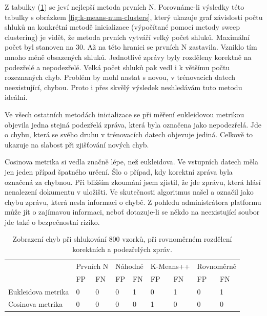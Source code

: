 \documentclass[thesis=M,czech]{FITthesis}[2012/10/20]
\begin{document}
		Z tabulky (\ref{tab:clustering_errors}) se jeví nejlepší metoda prvních N. Porovnáme-li výsledky této tabulky s obrázkem \ref{fig:k-means-num-clusters}, který ukazuje graf závislosti počtu shluků na konkrétní metodě inicializace (výpočítané pomocí metody sweep clustering) je vidět, že metoda prvních vytváří velký počet shluků. Maximální počet byl stanoven na 30. Až na této hranici se prvních N zastavila. Vzniklo tím mnoho méně obsazených shluků. Jednotlivé zprávy byly rozděleny korektně na podezřelé a nepodezřelé. Velká počet shluků pak vedl i k většímu počtu rozeznaných chyb. Problém by mohl nastat s novou, v trénovacích datech neexistující, chybou. Proto i přes skvělý výsledek neshledávám tuto metodu ideální.
		
		Ve všech ostatních metodách inicializace se při měření eukleidovou metrikou objevila jedna stejná podezřelá zpráva, která byla označena jako nepodezřelá. Jde o chybu, která se svého druhu v trénovacích datech objevuje jediná. Celkově to ukazuje na slabost při zjišťování nových chyb.
		
		Cosinova metrika si vedla značně lépe, než eukleidova. Ve vstupních datech měla jen jeden případ špatného určení. Šlo o případ, kdy korektní zpráva byla označená za chybnou. Při bližším zkoumání jsem zjistil, že jde zprávu, která hlásí nenalezení dokumentu v uložišti. Ve skutečnosti algoritmus našel a označil jako chybu zprávu, která nesla informaci o chybě. Z pohledu administrátora platformu může jít o zajímavou informaci, neboť dotazuje-li se někdo na neexistující soubor jde také o bezpečnostní riziko.
		
		\begin{table}[htb]\centering
			\centering
			\caption{Zobrazení chyb při shlukování 800 vzorků, při rovnoměrném rozdělení korektních a podezřelých zpráv.}
			\label{tab:clustering_errors}
			\begin{tabular}{|l|llllllll}
				\hline
				\multirow{2}{*}{}  & \multicolumn{2}{l|}{Prvních N}                    & \multicolumn{2}{l|}{Náhodné}                      & \multicolumn{2}{l|}{K-Means++}                    & \multicolumn{2}{l|}{Rovnoměrně}                   \\
				& \multicolumn{1}{l|}{FP} & \multicolumn{1}{l|}{FN} & \multicolumn{1}{l|}{FP} & \multicolumn{1}{l|}{FN} & \multicolumn{1}{l|}{FP} & \multicolumn{1}{l|}{FN} & \multicolumn{1}{l|}{FP} & \multicolumn{1}{l|}{FN} \\ \hline
				Eukleidova metrika & 0                       & 0                       & 0                       & 1                       & 0                       & 1                       & 0                       & 1                       \\ 
				Cosinova metrika   & 0                       & 0                       & 0                       & 0                       & 1                       & 0                       & 0                       & 0                       \\ 
			\end{tabular}
		\end{table}
	
\end{document}
